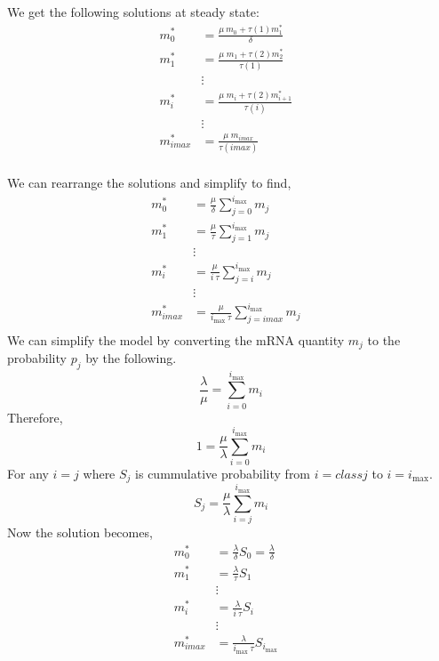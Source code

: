 \documentclass[review]{elsarticle}
\newcommand{\imax}{\ensuremath{i_{\max}}\xspace}
\begin{document}
We get the following solutions at steady state:
\begin{align*}
m_{0}^{*}  &= \frac{\mu\: m_{0}+\tau(1)m_{1}^{*}}{\delta} \\
m_{1}^{*}  &= \frac{\mu \; m_{1}+\tau(2)m_{2}^{*}}{\tau(1)} \\
& \vdots & \\
m_{i}^{*}  &= \frac{\mu \; m_{i}+\tau(2)m_{i+1}^{*}}{\tau(i)} \\
& \vdots & \\
m_{imax}^{*}  &= \frac{\mu \; m_{imax}}{\tau(imax)} \\
\end{align*}

We can rearrange the solutions and simplify to find,
\begin{align*}
m_{0}^{*}  &= \frac{\mu}{\delta}\sum_{j=0}^{\imax}m_{j} \\
m_{1}^{*}  &= \frac{\mu}{\tau}\sum_{j=1}^{\imax}m_{j}  \\
& \vdots & \\
m_{i}^{*}  &= \frac{\mu}{i \: \tau}\sum_{j=i}^{\imax}m_{j}  \\
& \vdots & \\
m_{imax}^{*}  &= \frac{\mu}{\imax \: \tau}\sum_{j=imax}^{\imax}m_{j}  \\
\end{align*}
We can simplify the model by converting the mRNA quantity $m_{j}$ to the probability $p_{j}$ by the following.
\begin{equation}
	\frac{\lambda}{\mu}=\sum_{i=0}^{\imax}m_{i}
\end{equation}
Therefore,
\begin{equation}
		1= \frac{\mu}{\lambda}\sum_{i=0}^{\imax}m_{i}
\end{equation}
For any $i=j$ where $S_{j}$ is cummulative probability from $i=class j$ to $ i= \imax$.
\begin{equation}
		S_{j} = \frac{\mu}{\lambda}\sum_{i=j}^{\imax}m_{i}
\end{equation}
Now the solution becomes,
\begin{align} \label{eq:decapped_solution} 
m_{0}^{*}  &= \frac{\lambda}{\delta}S_{0}=\frac{\lambda}{\delta} \\ \nonumber
m_{1}^{*}  &= \frac{\lambda}{\tau}S_{1} \\ \nonumber
& \vdots & \\ \nonumber
m_{i}^{*}  &= \frac{\lambda}{i \: \tau}S_{i}  \\ \nonumber
& \vdots & \\ \nonumber
m_{imax}^{*}  &= \frac{\lambda}{\imax \: \tau}S_{\imax}  \\ \nonumber
\end{align}
\end{document}
